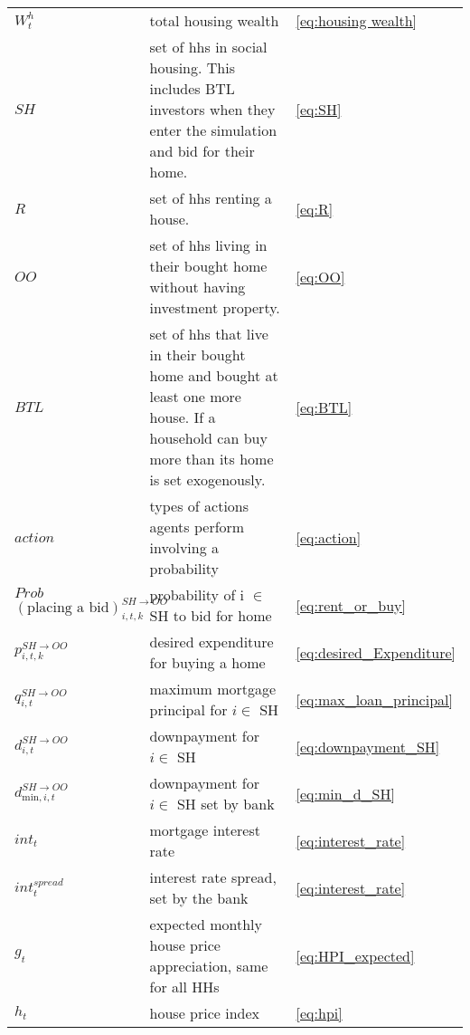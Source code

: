 \documentclass[]{article}
\begin{document}
\begin{longtable}{p{4cm} p{7cm}p{1cm}}
	$W^{h}_{t}$& total housing wealth& \eqref{eq:housing wealth}\\
	
	$SH$ & set of hhs in social housing. This includes BTL investors when they enter the simulation and bid for their home. &\eqref{eq:SH}\\
	
	$R$ & set of hhs renting a house. &\eqref{eq:R}\\
	
	$OO$ & set of hhs living in their bought home without having investment property. &\eqref{eq:OO}\\
	
	$BTL$ & set of hhs that live in their bought home and bought at least one more house. If a household can buy more than its home is set exogenously.&\eqref{eq:BTL}\\
	
	$action$&types of actions agents perform involving a probability &\eqref{eq:action}\\
	
	$Prob$ $(\text{placing a bid})^{SH \rightarrow OO}_{i,t,k}$&probability of i $\in$ SH to bid for home&\eqref{eq:rent_or_buy}\\
	
	$p^{SH \rightarrow OO}_{i,t,k}$ & desired expenditure for buying a home & \eqref{eq:desired_Expenditure}\\
	
	$q^{SH \rightarrow OO}_{i,t}$& maximum mortgage principal for $i \in$ SH &\eqref{eq:max_loan_principal} \\
	
	$d^{SH\rightarrow OO}_{i,t}$&downpayment for $i \in$ SH& \eqref{eq:downpayment_SH}\\
	
	$d^{SH\rightarrow OO}_{\text{min},i,t}$&downpayment for $i \in$ SH set by bank&\eqref{eq:min_d_SH}\\
	
	$int_{t}$& mortgage interest rate&\eqref{eq:interest_rate}\\
	
	$int_{t}^{spread}$& interest rate spread, set by the bank& \eqref{eq:interest_rate}\\
	
	$g_{t}$&expected monthly house price appreciation, same for all HHs &\eqref{eq:HPI_expected} \\
	
	$h_{t}$& house price index & \eqref{eq:hpi}\\
	

\end{longtable}
\end{document}
